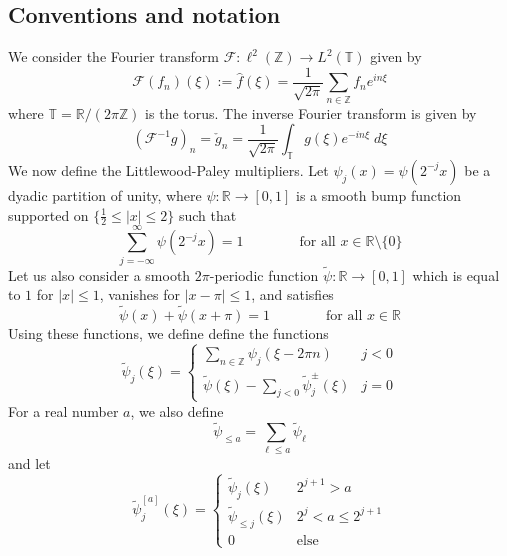 \documentclass[letterpaper, reqno,final]{amsart}
\newcommand{\bbZ}{\mathbb{Z}}
\newcommand{\bbR}{\mathbb{R}}
\newcommand{\bbT}{\mathbb{T}}
\begin{document}
\subsection{Conventions and notation}

We consider the Fourier transform $\mathcal{F} : \ell^2(\bbZ) \to L^2(\bbT)$ given by
\begin{equation}
    \mathcal{F}(f_n)(\xi) := \hat{f}(\xi) = \frac{1}{\sqrt{2\pi}} \sum_{n \in \bbZ} f_n e^{in\xi}  
\end{equation}
where $\bbT = \bbR / (2\pi \bbZ)$ is the torus.  The inverse Fourier transform is given by
\begin{equation}
    (\mathcal{F}^{-1} g)_n = \check{g}_n = \frac{1}{\sqrt{2\pi}} \int_{\bbT} g(\xi) e^{-in\xi}\;d\xi
\end{equation}
We now define the Littlewood-Paley multipliers.  Let $\psi_j(x) = \psi(2^{-j}x)$ be a dyadic partition of unity, where $\psi: \bbR \to [0,1]$ is a smooth bump function supported on $\{\frac{1}{2} \leq |x| \leq 2\}$ such that
    \begin{equation*}
        \sum_{j =-\infty}^\infty \psi(2^{-j}x) = 1 \qquad\qquad \text{for all } x \in \bbR \setminus \{0\}
    \end{equation*}  
    Let us also consider a smooth $2\pi$-periodic function $\tilde{\psi}:\bbR \to [0,1]$ which is equal to $1$ for $|x| \leq 1$, vanishes for $|x- \pi| \leq 1$, and satisfies
    \begin{equation*}
        \tilde{\psi}(x) + \tilde{\psi}(x+\pi) = 1 \qquad\qquad \text{for all } x \in \bbR
    \end{equation*}
Using these functions, we define define the functions
\begin{equation}\label{eqn:tilde-psi-def}
    \tilde{\psi}_j(\xi) = \begin{cases}
                    \sum_{n \in \bbZ} \psi_j(\xi - 2\pi n) & j < 0\\
                    \tilde{\psi}(\xi) - \sum_{j < 0} \tilde{\psi}^{\pm}_j(\xi) & j = 0
        \end{cases}
\end{equation}
For a real number $a$, we also define
\begin{equation*}
    \tilde{\psi}_{\leq a} = \sum_{\ell \leq a} \tilde{\psi}_\ell
\end{equation*}
and let
\begin{equation*}
    \tilde{\psi}^{[a]}_j(\xi) = \begin{cases}
        \tilde{\psi}_j(\xi) & 2^{j+1} > a\\
        \tilde{\psi}_{\leq j}(\xi) & 2^j < a \leq 2^{j+1}\\
        0 & \text{else}
    \end{cases}
\end{equation*}
\end{document}
